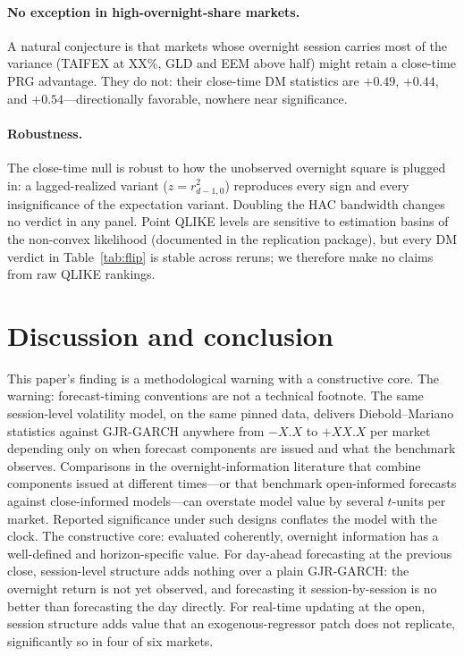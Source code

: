 \documentclass[11pt,a4paper]{article}
\begin{document}
\paragraph{No exception in high-overnight-share markets.} A natural conjecture is that markets whose overnight session carries most of the variance (TAIFEX at
XX\%,
GLD and EEM above half) might retain a close-time PRG advantage. They do not: their close-time DM statistics are $+0.49$, $+0.44$, and $+0.54$---directionally favorable, nowhere near significance.

\paragraph{Robustness.} The close-time null is robust to how the unobserved overnight square is plugged in: a lagged-realized variant ($z = r^2_{d-1,0}$) reproduces every sign and every insignificance of the expectation variant.
Doubling the HAC bandwidth changes no verdict in any panel. Point QLIKE levels are sensitive to estimation basins of the non-convex likelihood (documented in the replication package), but every DM verdict in Table~\ref{tab:flip} is stable across reruns; we therefore make no claims from raw QLIKE rankings.

\section{Discussion and conclusion}

This paper's finding is a methodological warning with a constructive core. The warning: forecast-timing conventions are not a technical footnote. The same session-level volatility model, on the same pinned data, delivers Diebold--Mariano statistics against GJR-GARCH anywhere from
$-X.X$ to $+XX.X$
per market depending only on when forecast components are issued and what the benchmark observes. Comparisons in the overnight-information literature that combine components issued at different times---or that benchmark open-informed forecasts against close-informed models---can overstate model value by several $t$-units per market. Reported significance under such designs conflates the model with the clock. The constructive core: evaluated coherently, overnight information has a well-defined and horizon-specific value. For day-ahead forecasting at the previous close, session-level structure adds nothing over a plain GJR-GARCH: the overnight return is not yet observed, and forecasting it session-by-session is no better than forecasting the day directly. For real-time updating at the open, session structure adds value that an exogenous-regressor patch does not replicate, significantly so in four of six markets.
\end{document}
